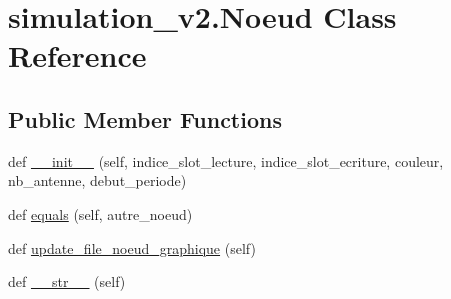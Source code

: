 \hypertarget{classsimulation__v2_1_1Noeud}{}\section{simulation\+\_\+v2.\+Noeud Class Reference}
\label{classsimulation__v2_1_1Noeud}
\subsection*{Public Member Functions}
\begin{DoxyCompactItemize}
\item 
def \hyperlink{classsimulation__v2_1_1Noeud_a842c95f93aba9b25517d39c840d518f7}{\+\_\+\+\_\+init\+\_\+\+\_\+} (self, indice\+\_\+slot\+\_\+lecture, indice\+\_\+slot\+\_\+ecriture, couleur, nb\+\_\+antenne, debut\+\_\+periode)
\item 
def \hyperlink{classsimulation__v2_1_1Noeud_a0b802b864141cba8422abc1988e98954}{equals} (self, autre\+\_\+noeud)
\item 
def \hyperlink{classsimulation__v2_1_1Noeud_ad92bd9c3c1d6a3663255d37d1e02c602}{update\+\_\+file\+\_\+noeud\+\_\+graphique} (self)
\item 
def \hyperlink{classsimulation__v2_1_1Noeud_ab77bc9489b0a4d67dd565b803a921956}{\+\_\+\+\_\+str\+\_\+\+\_\+} (self)
\end{DoxyCompactItemize}
